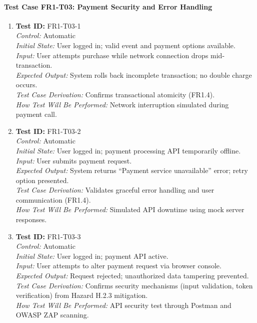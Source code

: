\documentclass[12pt, titlepage]{article}
\begin{document}
\paragraph{Test Case FR1-T03: Payment Security and Error Handling}

\begin{enumerate}\setlength{\itemsep}{1em}
    \item \textbf{Test ID:} FR1-T03-1\\[0.5em]
    \textit{Control:} Automatic\\[0.3em]
    \textit{Initial State:} User logged in; valid event and payment options available.\\[0.3em]
    \textit{Input:} User attempts purchase while network connection drops mid-transaction.\\[0.3em]
    \textit{Expected Output:} System rolls back incomplete transaction; no double charge occurs.\\[0.3em]
    \textit{Test Case Derivation:} Confirms transactional atomicity (FR1.4).\\[0.3em]
    \textit{How Test Will Be Performed:} Network interruption simulated during payment call.

    \item \textbf{Test ID:} FR1-T03-2\\[0.5em]
    \textit{Control:} Automatic\\[0.3em]
    \textit{Initial State:} User logged in; payment processing API temporarily offline.\\[0.3em]
    \textit{Input:} User submits payment request.\\[0.3em]
    \textit{Expected Output:} System returns “Payment service unavailable” error; retry option presented.\\[0.3em]
    \textit{Test Case Derivation:} Validates graceful error handling and user communication (FR1.4).\\[0.3em]
    \textit{How Test Will Be Performed:} Simulated API downtime using mock server responses.

    \item \textbf{Test ID:} FR1-T03-3\\[0.5em]
    \textit{Control:} Automatic\\[0.3em]
    \textit{Initial State:} User logged in; payment API active.\\[0.3em]
    \textit{Input:} User attempts to alter payment request via browser console.\\[0.3em]
    \textit{Expected Output:} Request rejected; unauthorized data tampering prevented.\\[0.3em]
    \textit{Test Case Derivation:} Confirms security mechanisms (input validation, token verification) from Hazard H.2.3 mitigation.\\[0.3em]
    \textit{How Test Will Be Performed:} API security test through Postman and OWASP ZAP scanning.
\end{enumerate}
\end{document}
